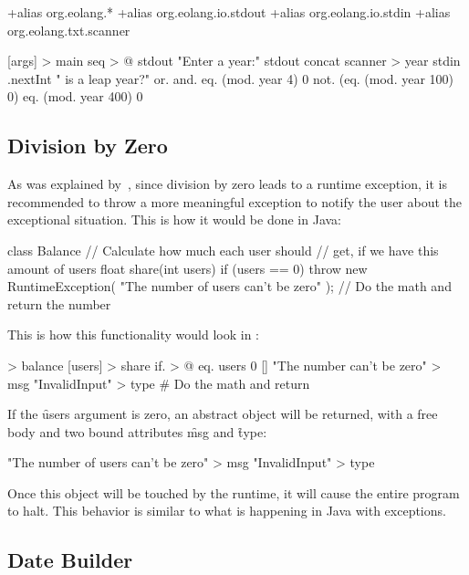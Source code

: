 \begin{eocode}
+alias org.eolang.*
+alias org.eolang.io.stdout
+alias org.eolang.io.stdin
+alias org.eolang.txt.scanner

[args] > main
  seq > @
    stdout
      "Enter a year:"
    stdout
      concat
        scanner > year
          stdin
        .nextInt
        " is a leap year?"
        or.
          and.
            eq. (mod. year 4) 0
            not. (eq. (mod. year 100) 0)
          eq. (mod. year 400) 0
\end{eocode}

\subsection{Division by Zero}

As was explained by~\citet[p.314]{eckel2006thinking}, since division by zero
leads to a runtime exception, it is recommended to throw a more meaningful
exception to notify the user about the exceptional situation. This is how
it would be done in Java:

\begin{eocode}
class Balance {
  // Calculate how much each user should
  // get, if we have this amount of users
  float share(int users) {
    if (users == 0) {
      throw new RuntimeException(
        "The number of users can't be zero"
      );
    }
    // Do the math and return the number
  }
}
\end{eocode}

This is how this functionality would look in \eo{}:

\begin{eocode}
[] > balance
  [users] > share
    if. > @
      eq. users 0
      []
        "The number can't be zero" > msg
        "InvalidInput" > type
      # Do the math and return
\end{eocode}

If the \f{users} argument is zero, an abstract object
will be returned, with a free body and two bound attributes
\f{msg} and \f{type}:

\begin{eocode}
[]
  "The number of users can't be zero" > msg
  "InvalidInput" > type
\end{eocode}

Once this object will be touched by the runtime, it will cause
the entire program to halt. This behavior is similar to what
is happening in Java with exceptions.

\subsection{Date Builder}


